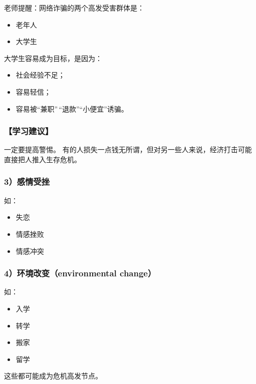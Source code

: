 \documentclass[
  chinese,
  9pt,
  a4paper,
]{ctexart}
\providecommand{\tightlist}{%
  \setlength{\itemsep}{0pt}\setlength{\parskip}{0pt}}
\begin{document}
老师提醒：网络诈骗的两个高发受害群体是：

\begin{itemize}
\tightlist
\item
  老年人
\item
  大学生
\end{itemize}

大学生容易成为目标，是因为：

\begin{itemize}
\tightlist
\item
  社会经验不足；
\item
  容易轻信；
\item
  容易被``兼职''\,``退款''``小便宜''诱骗。
\end{itemize}

\subsubsection{【学习建议】}\label{ux5b66ux4e60ux5efaux8bae-1}

一定要提高警惕。
有的人损失一点钱无所谓，但对另一些人来说，经济打击可能直接把人推入生存危机。

\subsubsection{3）感情受挫}\label{ux611fux60c5ux53d7ux632b}

如：

\begin{itemize}
\tightlist
\item
  失恋
\item
  情感挫败
\item
  情感冲突
\end{itemize}

\subsubsection{4）环境改变（environmental
change）}\label{ux73afux5883ux6539ux53d8environmental-change}

如：

\begin{itemize}
\tightlist
\item
  入学
\item
  转学
\item
  搬家
\item
  留学
\end{itemize}

这些都可能成为危机高发节点。
\end{document}
